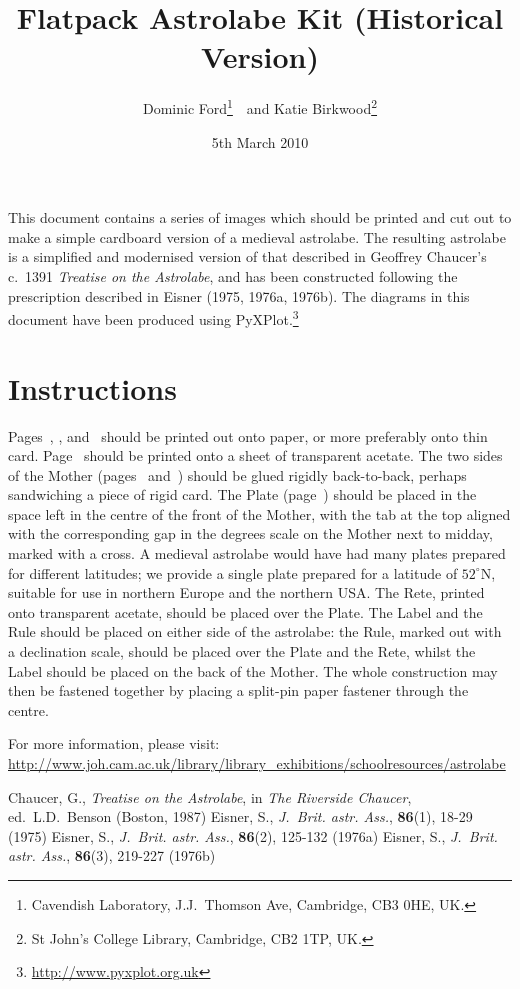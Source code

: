 \documentclass[a4paper,onecolumn,10pt]{article}
\title{\vspace{-3cm}Flatpack Astrolabe Kit (Historical Version)}
\author{Dominic Ford\footnote{Cavendish Laboratory, J.J.\ Thomson Ave, Cambridge, CB3 0HE, UK.}~~and Katie Birkwood\footnote{St John's College Library, Cambridge, CB2 1TP, UK.}}
\date{5th March 2010}
\begin{document}
\maketitle
\setcounter{footnote}{3}

This document contains a series of images which should be printed and cut out
to make a simple cardboard version of a medieval astrolabe. The resulting
astrolabe is a simplified and modernised version of that described in Geoffrey
Chaucer's c.\ 1391 {\it Treatise on the Astrolabe}, and has been constructed
following the prescription described in Eisner (1975, 1976a, 1976b). The
diagrams in this document have been produced using
PyXPlot.\footnote{\url{http://www.pyxplot.org.uk}}

\section*{Instructions}

Pages~\pageref{mother_back}, \pageref{mother_front}, \pageref{plate}
and~\pageref{rule} should be printed out onto paper, or more preferably onto
thin card.  Page~\pageref{rete} should be printed onto a sheet of transparent
acetate. The two sides of the Mother (pages~\pageref{mother_back}
and~\pageref{mother_front}) should be glued rigidly back-to-back, perhaps
sandwiching a piece of rigid card. The Plate (page~\pageref{plate}) should be
placed in the space left in the centre of the front of the Mother, with the tab
at the top aligned with the corresponding gap in the degrees scale on the
Mother next to midday, marked with a cross. A medieval astrolabe would have had
many plates prepared for different latitudes; we provide a single plate
prepared for a latitude of $52^\circ$N, suitable for use in northern Europe and
the northern USA. The Rete, printed onto transparent acetate, should be placed
over the Plate.  The Label and the Rule should be placed on either side of the
astrolabe: the Rule, marked out with a declination scale, should be placed over
the Plate and the Rete, whilst the Label should be placed on the back of the
Mother. The whole construction may then be fastened together by placing a
split-pin paper fastener through the centre.

For more information, please visit: \url{http://www.joh.cam.ac.uk/library/library_exhibitions/schoolresources/astrolabe}

\begin{thebibliography}{9}
Chaucer, G., \textit{Treatise on the Astrolabe}, in {\it The Riverside Chaucer}, ed.\ L.D.\ Benson (Boston, 1987)
Eisner, S., \textit{J.\ Brit. astr. Ass.}, \textbf{86}(1), 18-29 (1975)
Eisner, S., \textit{J.\ Brit. astr. Ass.}, \textbf{86}(2), 125-132 (1976a)
Eisner, S., \textit{J.\ Brit. astr. Ass.}, \textbf{86}(3), 219-227 (1976b)
\end{thebibliography}
\end{document}
